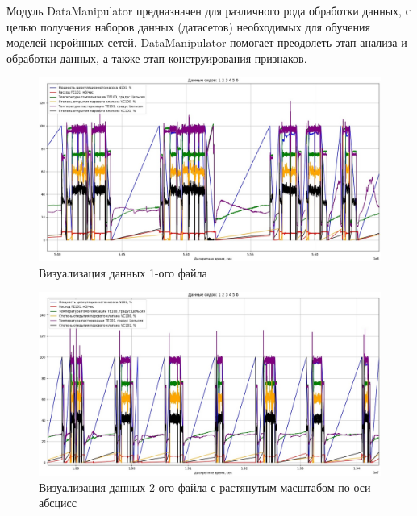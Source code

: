 {\standartFont

  \par Модуль DataManipulator предназначен для различного рода обработки данных, с целью получения наборов данных (датасетов) необходимых для обучения моделей неройнных сетей. DataManipulator помогает преодолеть этап анализа и обработки данных, а также этап конструирования признаков.

  \par

  \begin{figure}
    \centering
    \def\svgwidth{\textwidth}
    \includegraphics[scale=0.6]{images/forGeneral/data_1_visual.jpg}
    \caption{Визуализация данных 1-ого файла}
    \label{fig:Data1Visual}
  \end{figure}

  \begin{figure}
    \centering
    \def\svgwidth{\textwidth}
    \includegraphics[scale=0.6]{images/forGeneral/data_2_visual.jpg}
    \caption{ Визуализация данных 2-ого файла с растянутым масштабом по оси абсцисс}
    \label{fig:Data2Visual}
  \end{figure}

}
